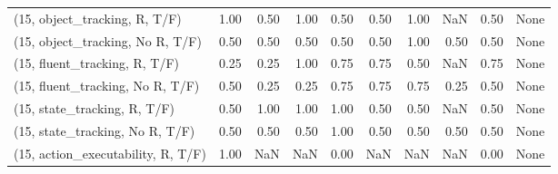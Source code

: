 \begin{table*}[h!]
\begin{adjustbox}{width=2\columnwidth,center}
\begin{tabular}{lrrr|rrr|rrr}
\midrule
(15, object\_tracking, R, T/F)         &                      1.00 &                  0.50 &                      1.00 &                          0.50 &                      0.50 &                          1.00 &                                    NaN &                               0.50 &                                  None \\
(15, object\_tracking, No R, T/F)      &                      0.50 &                  0.50 &                      0.50 &                          0.50 &                      0.50 &                          1.00 &                                   0.50 &                               0.50 &                                  None \\
(15, fluent\_tracking, R, T/F)         &                      0.25 &                  0.25 &                      1.00 &                          0.75 &                      0.75 &                          0.50 &                                    NaN &                               0.75 &                                  None \\
(15, fluent\_tracking, No R, T/F)      &                      0.50 &                  0.25 &                      0.25 &                          0.75 &                      0.75 &                          0.75 &                                   0.25 &                               0.50 &                                  None \\
(15, state\_tracking, R, T/F)          &                      0.50 &                  1.00 &                      1.00 &                          1.00 &                      0.50 &                          0.50 &                                    NaN &                               0.50 &                                  None \\
(15, state\_tracking, No R, T/F)       &                      0.50 &                  0.50 &                      0.50 &                          1.00 &                      0.50 &                          0.50 &                                   0.50 &                               0.50 &                                  None \\
(15, action\_executability, R, T/F)    &                      1.00 &                   NaN &                       NaN &                          0.00 &                       NaN &                           NaN &                                    NaN &                               0.00 &                                  None \\

\end{tabular}
\end{adjustbox}
\end{table*}
